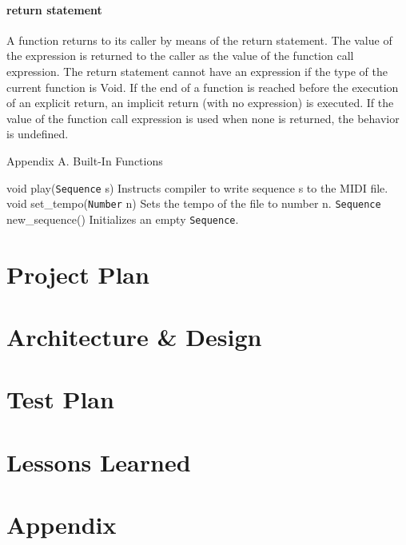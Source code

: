 \documentclass[12pt,A4]{book}
\begin{document}
\subsubsection{return statement}
A function returns to its caller by means of the return statement. The value of the expression is returned to the caller as the value of the function call expression. The return statement cannot have an expression if the type of the current function is Void.
If the end of a function is reached before the execution of an explicit return, an implicit return (with no expression) is executed. If the value of the function call expression is used when none is returned, the behavior is undefined.

Appendix A. Built-In Functions

void play(\verb|Sequence| s)
    Instructs compiler to write sequence s to the MIDI file.
void set_tempo(\verb|Number| n)
    Sets the tempo of the file to number n.
\verb|Sequence| new_sequence()
    Initializes an empty \verb|Sequence|.
\chapter{Project Plan}
\chapter{Architecture \& Design}
\chapter{Test Plan}
\chapter{Lessons Learned}
\chapter{Appendix}
\end{document}
